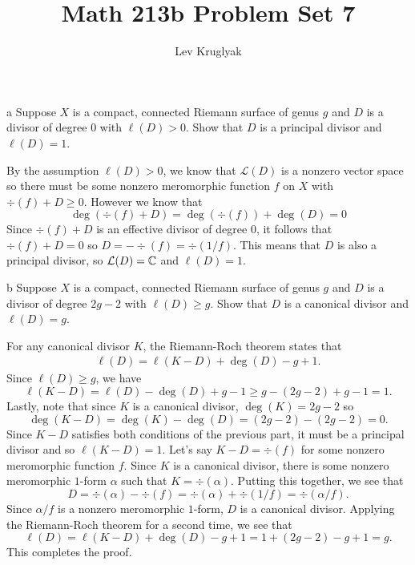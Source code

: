 \documentclass[expanded]{lkx_pset}
\title{Math 213b Problem Set 7}
\author{Lev Kruglyak}
\begin{document}
\maketitle

\begin{problem}{1}
\end{problem}

\begin{parts}
	\begin{part}{a}
		Suppose $X$ is a compact, connected Riemann surface of genus $g$ and $D$ is a divisor of degree $0$ with $\ell(D)>0$. Show that $D$ is a principal divisor and $\ell(D)=1$.
	\end{part}

	By the assumption $\ell(D)>0$, we know that $\mathcal{L}(D)$ is a nonzero vector space so there must be some nonzero meromorphic function $f$ on $X$ with $\div(f)+D\geq 0$. However we know that
	\[
		\deg(\div(f) + D) = \deg(\div(f)) + \deg(D) = 0
	\]
	Since $\div(f)+D$ is an effective divisor of degree $0$, it follows that $\div(f)+D = 0$ so $D=-\div(f)=\div(1/f)$. This means that $D$ is also a principal divisor, so $\mathcal{L}(D)=\mathbb{C}$ and $\ell(D)=1$.

	\begin{part}{b}
		Suppose $X$ is a compact, connected Riemann surface of genus $g$ and $D$ is a divisor of degree $2g-2$ with $\ell(D)\geq g$. Show that $D$ is a canonical divisor and $\ell(D)=g$.
	\end{part}
	For any canonical divisor $K$, the Riemann-Roch theorem states that
	\[
		\begin{aligned}
			\ell(D) = \ell(K-D)+ \deg(D) - g +1.
		\end{aligned}
	\]
	Since $\ell(D)\geq g$, we have
	\[
		\ell(K-D) = \ell(D) - \deg(D)+ g- 1 \geq g - (2g-2)+g-1=1.
	\]
	Lastly, note that since $K$ is a canonical divisor, $\deg(K)=2g-2$ so
	\[
		\deg(K-D)=\deg(K)-\deg(D) = (2g-2)-(2g-2)=0.
	\]
	Since $K-D$ satisfies both conditions of the previous part, it must be a principal divisor and so $\ell(K-D)=1$. Let's say $K-D=\div(f)$ for some nonzero meromorphic function $f$. Since $K$ is a canonical divisor, there is some nonzero meromorphic $1$-form $\alpha$ such that $K=\div(\alpha)$. Putting this together, we see that
	\[
		D = \div(\alpha)-\div(f) = \div(\alpha)+\div(1/f)=\div(\alpha/f).
	\]
	Since $\alpha/f$ is a nonzero meromorphic $1$-form, $D$ is a canonical divisor. Applying the Riemann-Roch theorem for a second time, we see that
	\[
		\ell(D) = \ell(K-D) + \deg(D) -  g + 1 = 1 + (2g-2)-g + 1= g.
	\]
	This completes the proof.
\end{parts}
\end{document}
